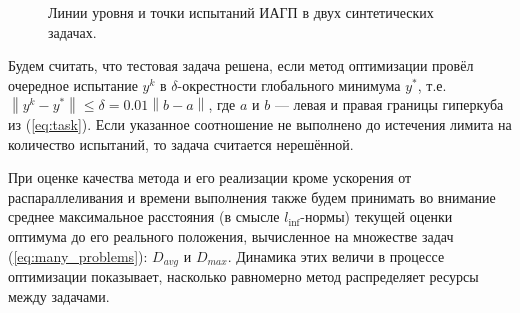 \documentclass[11pt, oneside, a4paper]{article}
\begin{document}
\begin{figure}[ht]
    \centering
    \caption{Линии уровня и точки испытаний ИАГП в двух синтетических задачах.}
    \label{fig:isolines}
\end{figure}

Будем считать, что тестовая задача решена, если метод оптимизации провёл очередное испытание \(y^k\) в
\(\delta\)-окрестности глобального минимума \(y^*\), т.е. $\left\|y^k-
y^*\right\|\leqslant \delta = 0.01\left\|b-a\right\|$, где \(a\) и \(b\) --- левая и правая границы гиперкуба из (\ref{eq:task}).
Если указанное соотношение не выполнено до истечения лимита на количество испытаний, то задача считается нерешённой.

При оценке качества метода и его реализации кроме ускорения от распараллеливания и времени выполнения также будем принимать во внимание среднее максимальное расстояния (в смысле \(l_{\inf}\)-нормы) текущей оценки оптимума до его реального положения,
вычисленное на множестве задач (\ref{eq:many_problems}): \(D_{avg}\) и \(D_{max}\). Динамика этих величи в процессе оптимизации
показывает, насколько равномерно метод распределяет ресурсы между задачами.
\end{document}
